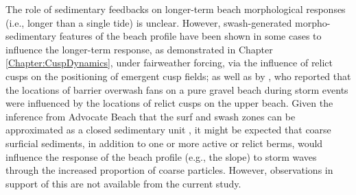 The role of sedimentary feedbacks on longer-term beach morphological responses (i.e., longer than a single tide) is unclear. However, swash-generated morpho-sedimentary features of the beach profile have been shown in some cases to influence the longer-term response, as demonstrated in Chapter \ref{Chapter:CuspDynamics}, under fairweather forcing, via the influence of relict cusps on the positioning of emergent cusp fields; as well as by \citet{Orford_Carter1984_cuspoverwash}, who reported that the locations of barrier overwash fans on a pure gravel beach during storm events were influenced by the locations of relict cusps on the upper beach. Given the inference from Advocate Beach that the surf and swash zones can be approximated as a closed sedimentary unit \citep[Chapter \ref{Chapter:MSDBeach}, based on anecdotal evidence from][]{Hay_etal2014}, it might be expected that coarse surficial sediments, in addition to one or more active or relict berms, would influence the response of the beach profile (e.g., the slope) to storm waves through the increased proportion of coarse particles. However, observations in support of this are not available from the current study.


